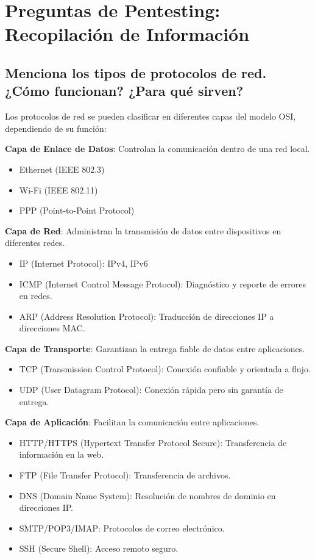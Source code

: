 \section{Preguntas de Pentesting: Recopilación de Información}

\subsection{Menciona los tipos de protocolos de red. ¿Cómo funcionan? ¿Para qué sirven?}
Los protocolos de red se pueden clasificar en diferentes capas del modelo OSI, dependiendo de su función:

\textbf{Capa de Enlace de Datos}: Controlan la comunicación dentro de una red local.
\begin{itemize}
    \item Ethernet (IEEE 802.3)
    \item Wi-Fi (IEEE 802.11)
    \item PPP (Point-to-Point Protocol)
\end{itemize}

\textbf{Capa de Red}: Administran la transmisión de datos entre dispositivos en diferentes redes.
\begin{itemize}
    \item IP (Internet Protocol): IPv4, IPv6
    \item ICMP (Internet Control Message Protocol): Diagnóstico y reporte de errores en redes.
    \item ARP (Address Resolution Protocol): Traducción de direcciones IP a direcciones MAC.
\end{itemize}

\textbf{Capa de Transporte}: Garantizan la entrega fiable de datos entre aplicaciones.
\begin{itemize}
    \item TCP (Transmission Control Protocol): Conexión confiable y orientada a flujo.
    \item UDP (User Datagram Protocol): Conexión rápida pero sin garantía de entrega.
\end{itemize}

\textbf{Capa de Aplicación}: Facilitan la comunicación entre aplicaciones.
\begin{itemize}
    \item HTTP/HTTPS (Hypertext Transfer Protocol Secure): Transferencia de información en la web.
    \item FTP (File Transfer Protocol): Transferencia de archivos.
    \item DNS (Domain Name System): Resolución de nombres de dominio en direcciones IP.
    \item SMTP/POP3/IMAP: Protocolos de correo electrónico.
    \item SSH (Secure Shell): Acceso remoto seguro.
\end{itemize}

